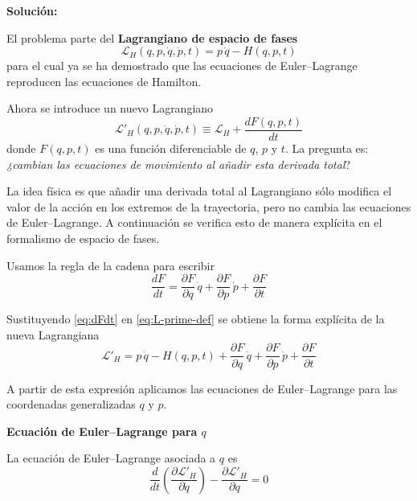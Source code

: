 \documentclass{article}
\begin{document}
\textcolor{Cinnabar}{\textbf{Solución:}} \vspace{0.5cm}

El problema parte del \textbf{Lagrangiano de espacio de fases}
\begin{equation}
  \mathcal{L}_{H}(q,p,\dot q,\dot p,t)
  = p\,\dot q - H(q,p,t)
\end{equation}
para el cual ya se ha demostrado que las ecuaciones de Euler--Lagrange
reproducen las ecuaciones de Hamilton.  

Ahora se introduce un nuevo Lagrangiano
\begin{equation}
  \mathcal{L}'_{H}(q,p,\dot q,\dot p,t)
  \equiv \mathcal{L}_{H}
  + \frac{dF(q,p,t)}{dt}
  \label{eq:L-prime-def}
\end{equation}
donde $F(q,p,t)$ es una función diferenciable de $q$, $p$ y $t$.  
La pregunta es: \emph{¿cambian las ecuaciones de movimiento al añadir esta derivada total}?

La idea física es que añadir una derivada total al Lagrangiano sólo modifica el
valor de la acción en los extremos de la trayectoria, pero no cambia las
ecuaciones de Euler–Lagrange. A continuación se verifica esto de manera
explícita en el formalismo de espacio de fases.

Usamos la regla de la cadena para escribir
\begin{equation}
  \frac{dF}{dt}
  = \frac{\partial F}{\partial q}\,\dot q
  + \frac{\partial F}{\partial p}\,\dot p
  + \frac{\partial F}{\partial t}
  \label{eq:dFdt}
\end{equation}

Sustituyendo \eqref{eq:dFdt} en \eqref{eq:L-prime-def} se obtiene la forma
explícita de la nueva Lagrangiana
\begin{equation}
  \mathcal{L}'_{H}
  = p\,\dot q - H(q,p,t)
    + \frac{\partial F}{\partial q}\,\dot q
    + \frac{\partial F}{\partial p}\,\dot p
    + \frac{\partial F}{\partial t}
  \label{eq:L-prime-expl}
\end{equation}

A partir de esta expresión aplicamos las ecuaciones de Euler--Lagrange para
las coordenadas generalizadas $q$ y $p$.

\textcolor{trueblue}{\textbf{Ecuación de Euler–Lagrange para $q$}}

La ecuación de Euler–Lagrange asociada a $q$ es
\begin{equation}
  \frac{d}{dt}
  \left(
    \frac{\partial \mathcal{L}'_{H}}{\partial \dot q}
  \right)
  -
  \frac{\partial \mathcal{L}'_{H}}{\partial q}
  = 0
  \label{eq:EL-q}
\end{equation}
\end{document}
